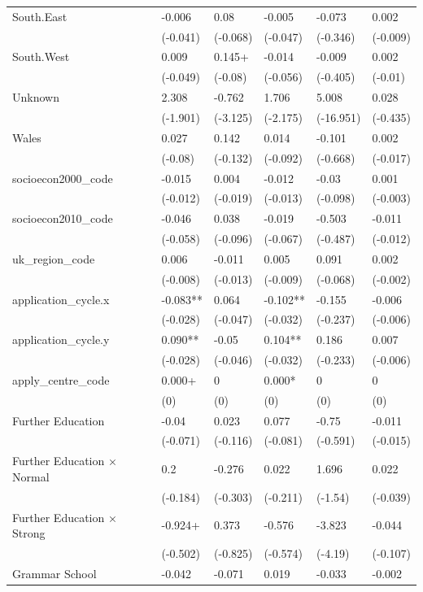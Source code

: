 \begin{longtable}{llllll}
South.East & -0.006 & 0.08 & -0.005 & -0.073 & 0.002 \\
 & (-0.041) & (-0.068) & (-0.047) & (-0.346) & (-0.009) \\
South.West & 0.009 & 0.145+ & -0.014 & -0.009 & 0.002 \\
 & (-0.049) & (-0.08) & (-0.056) & (-0.405) & (-0.01) \\
Unknown & 2.308 & -0.762 & 1.706 & 5.008 & 0.028 \\
 & (-1.901) & (-3.125) & (-2.175) & (-16.951) & (-0.435) \\
Wales & 0.027 & 0.142 & 0.014 & -0.101 & 0.002 \\
 & (-0.08) & (-0.132) & (-0.092) & (-0.668) & (-0.017) \\
socioecon2000\_code & -0.015 & 0.004 & -0.012 & -0.03 & 0.001 \\
 & (-0.012) & (-0.019) & (-0.013) & (-0.098) & (-0.003) \\
socioecon2010\_code & -0.046 & 0.038 & -0.019 & -0.503 & -0.011 \\
 & (-0.058) & (-0.096) & (-0.067) & (-0.487) & (-0.012) \\
uk\_region\_code & 0.006 & -0.011 & 0.005 & 0.091 & 0.002 \\
 & (-0.008) & (-0.013) & (-0.009) & (-0.068) & (-0.002) \\
application\_cycle.x & -0.083** & 0.064 & -0.102** & -0.155 & -0.006 \\
 & (-0.028) & (-0.047) & (-0.032) & (-0.237) & (-0.006) \\
application\_cycle.y & 0.090** & -0.05 & 0.104** & 0.186 & 0.007 \\
 & (-0.028) & (-0.046) & (-0.032) & (-0.233) & (-0.006) \\
apply\_centre\_code & 0.000+ & 0 & 0.000* & 0 & 0 \\
 & (0) & (0) & (0) & (0) & (0) \\
Further Education & -0.04 & 0.023 & 0.077 & -0.75 & -0.011 \\
 & (-0.071) & (-0.116) & (-0.081) & (-0.591) & (-0.015) \\
Further Education × Normal & 0.2 & -0.276 & 0.022 & 1.696 & 0.022 \\
 & (-0.184) & (-0.303) & (-0.211) & (-1.54) & (-0.039) \\
Further Education × Strong & -0.924+ & 0.373 & -0.576 & -3.823 & -0.044 \\
 & (-0.502) & (-0.825) & (-0.574) & (-4.19) & (-0.107) \\
Grammar School & -0.042 & -0.071 & 0.019 & -0.033 & -0.002 \\

\end{longtable}

